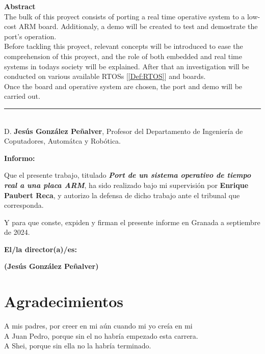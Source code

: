 \noindent\textbf{Abstract}\\

The bulk of this proyect consists of porting a real time operative system to a low-cost ARM board. Additionaly, a demo will be created to test and demostrate the port's operation.\\

Before tackling this proyect, relevant concepts will be introduced to ease the comprehension of this proyect, and the role of both embedded and real time systems in todays society will be explained. After that an investigation will be conducted on various available RTOSs [\ref{Def:RTOS}] and boards.\\

Once the board and operative system are chosen, the port and demo will be carried out.\\

\cleardoublepage

\thispagestyle{empty}

\noindent\rule[-1ex]{\textwidth}{2pt}\\[4.5ex]

D. \textbf{Jesús González Peñalver}, Profesor del Departamento de Ingeniería de Coputadores, Automátca y Robótica.

\vspace{0.5cm}

\textbf{Informo:}

\vspace{0.5cm}

Que el presente trabajo, titulado \textit{\textbf{Port de un sistema operativo de tiempo real a una placa ARM}},
ha sido realizado bajo mi supervisión por \textbf{Enrique Paubert Reca}, y autorizo la defensa de dicho trabajo ante el tribunal
que corresponda.

\vspace{0.5cm}

Y para que conste, expiden y firman el presente informe en Granada a septiembre de 2024.

\vspace{1cm}

\textbf{El/la director(a)/es: }

\vspace{5cm}

\noindent \textbf{(Jesús González Peñalver)}

\chapter*{Agradecimientos}

A mis padres, por creer en mi aún cuando mi yo creía en mi\\

A Juan Pedro, porque sin el no habría empezado esta carrera.\\

A Shei, porque sin ella no la habría terminado.\\
